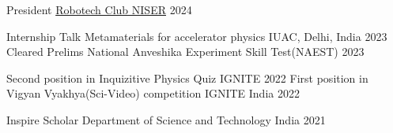 


\begin{cvhonors}


    \cvhonor
    {President} %
    {\href{https://www.niser.ac.in/~smishra/club/rtc/}{Robotech Club NISER}} %
    {} %
    {2024} %
    
    \cvhonor
	{Internship Talk} %
	{Metamaterials for accelerator physics} %
	{IUAC, Delhi, India} %
	{2023} %
	\cvhonor
	{Cleared Prelims} %
	{National Anveshika Experiment Skill Test(NAEST)} %
	{} %
	{2023} %
	
	\cvhonor
	{Second position in Inquizitive Physics Quiz} %
	{IGNITE } %
	{} %
	{2022} %
	\cvhonor
	{First position in Vigyan Vyakhya(Sci-Video) competition} %
	{IGNITE } %
	{India} %
	{2022} %
	
  	\cvhonor
	{Inspire Scholar} %
	{Department of Science and Technology} %
	{India} %
	{2021} %


\end{cvhonors}